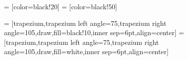  = [color=black!20]
 = [color=black!50]


%

 = [trapezium,trapezium left angle=75,trapezium right angle=105,draw,fill=black!10,inner sep=6pt,align=center]
 = [trapezium,trapezium left angle=75,trapezium right angle=105,draw,fill=white,inner sep=6pt,align=center]


%

